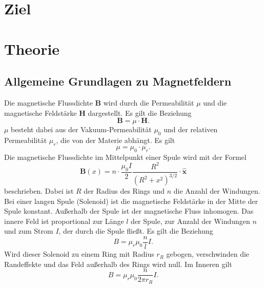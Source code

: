\section{Ziel}

\section{Theorie}
\label{sec:Theorie}

\cite{V308}

\subsection{Allgemeine Grundlagen zu Magnetfeldern} %
Die magnetische Flussdichte $\symbf{B}$ wird durch die Permeabilität $\mu$ und die 
magnetische Feldstärke $\symbf{H}$ dargestellt. Es gilt die Beziehung 
\begin{equation*} 
    \symbf{B} = \mu \cdot \symbf{H}.
\end{equation*}
$\mu$ besteht dabei aus der Vakuum-Permeabilität $\mu_{0}$ und der relativen 
Permeabilität $\mu_{r}$, die von der Materie abhängt. 
Es gilt 
\begin{equation*} 
    \mu = \mu_{0} \cdot \mu_{r}.
\end{equation*}
\newline
Die magnetische Flussdichte im Mittelpunkt einer Spule wird mit der Formel 
\begin{equation}
    \symbf{B}(x)= n \cdot \frac{\mu_{0} I}{2} \frac{R^2}{(R^2 +x^2)^{3/2}}\cdot \symbf{\hat{x}}
\end{equation}
beschrieben. 
Dabei ist $R$ der Radius des Rings und $n$ die Anzahl der Windungen.
Bei einer langen Spule (Solenoid) ist die magnetische Feldstärke in der Mitte der 
Spule konstant. Außerhalb der Spule ist der magnetische Fluss inhomogen. 
Das innere Feld ist proportional zur Länge $l$ der Spule, zur Anzahl der Windungen 
$n$ und zum Strom $I$, der durch die Spule fließt. 
Es gilt die Beziehung
\begin{equation}
B = \mu_{r} \mu_{0} \frac{n}{l} I.
\end{equation}
Wird dieser Solenoid zu einem Ring mit Radius $r_{R}$ gebogen, verschwinden die 
Randeffekte und das Feld außerhalb des Rings wird null. 
Im Inneren gilt
\begin{equation}
B = \mu_{r} \mu_{0} \frac{n}{2\pi r_{R}} I.
\end{equation}

